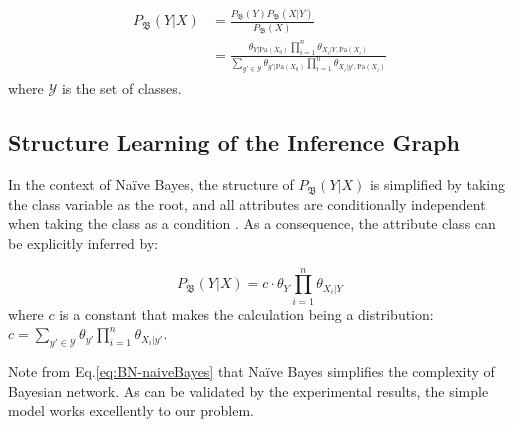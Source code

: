 \vspace{-1ex}
\begin{align}\label{eq:BNWithCls}
\begin{split}
P_\mathfrak{B}(Y|{X}) & = 
\frac{ P_\mathfrak{B}(Y) P_\mathfrak{B}({X}|Y) }{P_\mathfrak{B}({X})}\\
&=\frac{ \theta_{Y|\text{Pa}({X}_0)} \prod_{i=1}^{n} \theta_{X_i|Y, \text{Pa}({X}_i)} }{ \sum_{y'\in \mathcal{Y}} \theta_{y'|\text{Pa}({X}_0)} \prod_{i=1}^{n} \theta_{X_i|y', \text{Pa}({X}_i)} }
\end{split}
\end{align}
where $\mathcal{Y}$ is the set of classes.


\subsection{Structure Learning of the Inference Graph}

In the context of Na\"{i}ve Bayes, 
the structure of $P_\mathfrak{B}(Y|{X})$ is simplified by taking the class variable as the root, and all attributes are conditionally independent when taking the class as a condition \cite{petitjean2018accurate}. As a consequence, the attribute class can be explicitly inferred by:

\begin{equation}\label{eq:BN-naiveBayes}
P_\mathfrak{B}(Y| {X}) = c \cdot \theta_Y \prod_{i=1}^{n}\theta_{X_i|Y}
\end{equation}
where $c$ is a constant that makes the calculation being a distribution: $c=\sum_{y'\in \mathcal{Y}}  \theta_{y'} \prod_{i=1}^{n}\theta_{X_i|y'}$.

Note from Eq.\eqref{eq:BN-naiveBayes} that Na\"{i}ve Bayes simplifies the complexity of Bayesian network. As can be validated by the experimental results, the simple model works excellently to our problem. 

